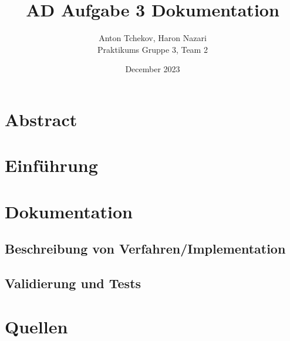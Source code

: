 \documentclass[utf8]{article}
\title{AD Aufgabe 3 Dokumentation}
\author{Anton Tchekov, Haron Nazari\\ Praktikums Gruppe 3, Team 2}
\date{December 2023}
\begin{document}
\maketitle

\section{Abstract}

\section{Einführung}

\section{Dokumentation}

\subsection{Beschreibung von Verfahren/Implementation}

\subsection{Validierung und Tests}

\section{Quellen}
\end{document}

